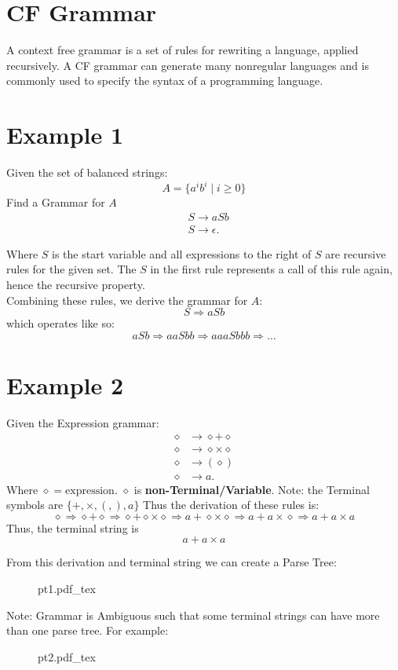 \documentclass[12pt]{book}
\title{\coursetitle\linebreak\lecturename}
\author{\\Cain Susko\\ 
           \\ \\ \\
      Queen's University 
    \\School of Computing\\}
\newcommand{\incfig}[1]{%
    {#1.pdf_tex}
}
\begin{document}
\begin{titlepage}
        \maketitle
\end{titlepage}


\section*{CF Grammar}
A context free grammar is a set of rules for rewriting a language, applied recursively.
A CF grammar can generate many nonregular languages and is commonly used to specify the syntax of a programming language.

\section*{Example 1}
Given the set of balanced strings:
\[A=\{a^i b^i  \mid i \geq 0\}\]
Find a Grammar for $A$
\begin{align*}
        &S\rightarrow aSb\\
        &S\rightarrow\epsilon
.\end{align*}

Where $S$ is the start variable and all expressions to the right of  $S$ are recursive rules for the given set.
The  $S$ in the first rule represents a call of this rule again, hence the recursive property.\\
Combining these rules, we derive the grammar for  $A$:
\[S \Rightarrow aSb\]
which operates like so:
\[aSb\Rightarrow aaSbb\Rightarrow aaaSbbb \Rightarrow \ldots\]

\section*{Example 2}
Given the Expression grammar:
\begin{align*}
        \diamond &\to \diamond +\diamond \\
        \diamond &\to \diamond \times \diamond \\
        \diamond &\to (\diamond)\\
        \diamond &\to a
.\end{align*}
Where $\diamond =\text{expression}$.
 $\diamond $ is \textbf{non-Terminal/Variable}.
Note: the Terminal symbols are $\{+,\times, (, ), a\}$
Thus the derivation of these rules is:
\[\diamond \Rightarrow \diamond + \diamond \Rightarrow \diamond + \diamond \times \diamond \Rightarrow a + \diamond \times \diamond \Rightarrow a+a\times \diamond \Rightarrow a+a\times a  \]
Thus, the terminal string is 
\[a+a\times a\]

From this derivation and terminal string we can create a Parse Tree:
\begin{figure}[h]
        \centering
        \incfig{pt1}
\end{figure}

Note: Grammar is Ambiguous such that some terminal strings can have more than one parse tree. 
For example:
\begin{figure}
        \centering
        \incfig{pt2}
\end{figure}
\end{document}
